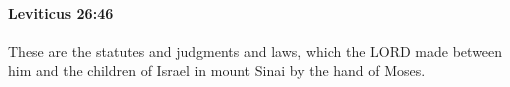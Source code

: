 
		\paragraph{Leviticus 26:46} %
			\label{LEVITICUS-26-46}

			These are the statutes and judgments and laws, which the LORD made between him and the children of Israel in mount Sinai by the hand of Moses.

